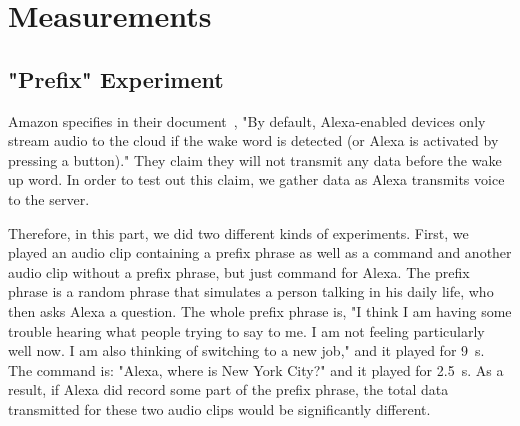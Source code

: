 \section{Measurements}





\subsection{"Prefix" Experiment}

Amazon specifies in their document~\cite{Alexadocument}, "By default, Alexa-enabled devices only stream audio to the cloud if the wake word is detected (or Alexa is activated by pressing a button)." They claim they will not transmit any data before the wake up word. In order to test out this claim, we gather data as Alexa transmits voice to the server.

Therefore, in this part, we did two different kinds of experiments. First, we played an audio clip containing a prefix phrase as well as a command and another audio clip without a prefix phrase, but just command for Alexa. The prefix phrase is a random phrase that simulates a person talking in his daily life, who then asks Alexa a question. The whole prefix phrase is, "I think I am having some trouble hearing what people trying to say to me. I am not feeling particularly well now. I am also thinking of switching to a new job," and it played for 9~s. The command is: "Alexa, where is New York City?" and it played for 2.5~s. As a result, if Alexa did record some part of the prefix phrase, the total data transmitted for these two audio clips would be significantly different.

